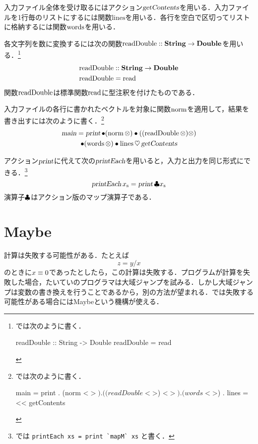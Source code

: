 \documentclass[platex,a5paper,twoside,fleqn,draft]{jsbook}
\begin{document}
入力ファイル全体を受け取るにはアクション$\textsl{getContents}$を用いる．入力ファイルを1行毎のリストにするには関数$\textrm{lines}$を用いる．各行を空白で区切ってリストに格納するには関数$\mathop{\textrm{words}}$を用いる．

各文字列を数に変換するには次の関数$\mathop{\textrm{readDouble}}::\mathord{\mathbf{String}}\rightarrow\mathord{\mathbf{Double}}$を用いる．\footnote{\haskell では次のように書く．
\begin{footcode}
      readDouble :: String -> Double
      readDouble = read
\end{footcode}}
\begin{align}
  \mathop{\textrm{readDouble}}&::\mathord{\mathbf{String}}\rightarrow\mathord{\mathbf{Double}}\\
  \mathop{\textrm{readDouble}}&=\mathop{\textrm{read}}
\end{align}
関数$\mathop{\textrm{readDouble}}$は標準関数$\mathop{\textrm{read}}$に型注釈を付けたものである．

入力ファイルの各行に書かれたベクトルを対象に関数$\mathop{\textrm{norm}}$を適用して，結果を書き出すには次のように書く．\footnote{\haskell では次のように書く．
\begin{footcode}
      main = print 
        . (norm <$>) 
        . ((readDouble <$>) <$>) 
        . (words <$>) 
        . lines 
        =<< getContents
\end{footcode}}
\begin{multline}
\mathop{\textsl{main}}=\mathop{\textsl{print}}
\mathbin{\bullet}(\mathop{\textrm{norm}}\otimes)
\mathbin{\bullet}((\mathop{\textrm{readDouble}}\otimes)\otimes)\\
\mathbin{\bullet}(\mathop{\textrm{words}}\otimes)
\mathbin{\bullet}\mathop{\textrm{lines}}
\mathbin{\heartsuit}\mathop{\textsl{getContents}}
\end{multline}

アクション$\mathop{\textsl{print}}$に代えて次の$\mathop{\textsl{printEach}}$を用いると，入力と出力を同じ形式にできる．\footnote{\haskell では \verb|printEach xs = print `mapM` xs| と書く．}
\begin{equation}
\mathop{\textsl{printEach}}{x}_\mathrm{s}=\mathop{\textsl{print}}\mathbin{\clubsuit}{x}_\mathrm{s}
\end{equation}
演算子$\mathbin{\clubsuit}$はアクション版のマップ演算子である．

\section{Maybe}
\label{sec:maybe}

計算は失敗する可能性がある．たとえば
\begin{equation}
z=y/x
\end{equation}
のときに$x\equiv0$であったとしたら，この計算は失敗する．プログラムが計算を失敗した場合，たいていのプログラマは大域ジャンプを試みる．しかし大域ジャンプは変数の書き換えを行うことであるから，別の方法が望まれる．\haskell では失敗する可能性がある場合にはMaybeという機構が使える．
\end{document}
